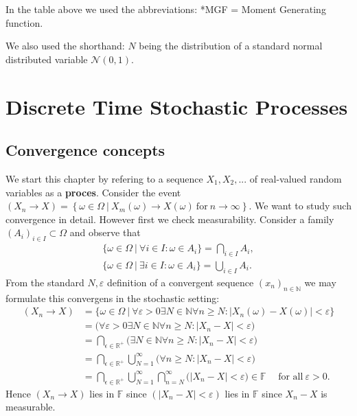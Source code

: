 \documentclass[a4paper,12pt,openany]{book}
\begin{document}
In the table above we used the abbreviations: *MGF = Moment Generating function.

We also used the shorthand: \(N\) being the distribution of a standard normal distributed variable \(\mathcal{N}(0,1)\).

\hypertarget{discrete-time-stochastic-processes}{%
\chapter{Discrete Time Stochastic Processes}\label{discrete-time-stochastic-processes}}

\hypertarget{convergence-concepts}{%
\section{Convergence concepts}\label{convergence-concepts}}

We start this chapter by refering to a sequence \(X_1,X_2,...\) of real-valued random variables as a \textbf{proces}. Consider the event \((X_n\to X)=\left\{\omega\in\Omega\ \vert\ X_m(\omega)\to X(\omega)\ \text{for}\ n\to \infty\right\}\). We want to study such convergence in detail. However first we check measurability. Consider a family \((A_i)_{i\in I}\subset \Omega\) and observe that
\begin{align*}
    \Big\{\omega\in \Omega\ \vert\ \forall i\in I : \omega \in A_i\Big\}=\bigcap_{i\in I} A_i,\tag{2.1}\\
    \Big\{\omega\in \Omega\ \vert\ \exists i\in I : \omega \in A_i\Big\}=\bigcup_{i\in I} A_i.\tag{2.2}
\end{align*}
From the standard \(N,\varepsilon\) definition of a convergent sequence \((x_n)_{n\in \mathbb{N}}\) we may formulate this convergens in the stochastic setting:
\begin{align*}
    (X_n\to X)&=\Big\{\omega\in \Omega\ \vert\ \forall\varepsilon>0 \exists N\in \mathbb{N} \forall n\ge N : \vert X_n(\omega)-X(\omega)\vert <\varepsilon\Big\}\\
    &=\Big(\forall\varepsilon>0 \exists N\in \mathbb{N} \forall n\ge N : \vert X_n-X\vert <\varepsilon\Big)\\
    &=\bigcap_{\epsilon\in \mathbb{R}^+}\Big(\exists N\in \mathbb{N} \forall n\ge N : \vert X_n-X\vert<\varepsilon\Big)\\
    &=\bigcap_{\epsilon\in \mathbb{R}^+}\bigcup_{N=1}^\infty\Big( \forall n\ge N : \vert X_n-X\vert<\varepsilon\Big)\\
    &=\bigcap_{\epsilon\in \mathbb{R}^+}\bigcup_{N=1}^\infty\bigcap_{n=N}^\infty\Big(  \vert X_n-X\vert<\varepsilon\Big)\in \mathbb{F}\hspace{15pt}\text{for all}\ \varepsilon>0.
\end{align*}
Hence \((X_n\to X)\) lies in \(\mathbb{F}\) since \((\vert X_n-X\vert <\varepsilon)\) lies in \(\mathbb{F}\) since \(X_n-X\) is measurable.
\end{document}
